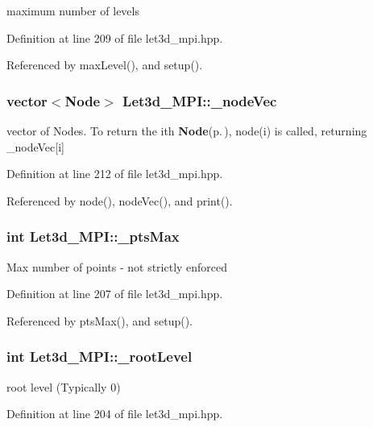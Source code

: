 maximum number of levels 

Definition at line 209 of file let3d\_\-mpi.hpp.

Referenced by max\-Level(), and setup().
\subsubsection{\setlength{\rightskip}{0pt plus 5cm}vector$<${\bf Node}$>$ {\bf Let3d\_\-MPI::\_\-node\-Vec}\hspace{0.3cm}{\tt  [protected]}}\label{classLet3d__MPI_0dca3d8b42eecae5aeb38ed9545698e8_0dca3d8b42eecae5aeb38ed9545698e8}


vector of Nodes. To return the ith {\bf Node}{\rm (p.\,\pageref{classLet3d__MPI_1_1Node})}, node(i) is called, returning \_\-node\-Vec[i] 

Definition at line 212 of file let3d\_\-mpi.hpp.

Referenced by node(), node\-Vec(), and print().
\subsubsection{\setlength{\rightskip}{0pt plus 5cm}int {\bf Let3d\_\-MPI::\_\-pts\-Max}\hspace{0.3cm}{\tt  [protected]}}\label{classLet3d__MPI_9d1de62409c283894e586edb8407d985_9d1de62409c283894e586edb8407d985}


Max number of points - not strictly enforced 

Definition at line 207 of file let3d\_\-mpi.hpp.

Referenced by pts\-Max(), and setup().
\subsubsection{\setlength{\rightskip}{0pt plus 5cm}int {\bf Let3d\_\-MPI::\_\-root\-Level}\hspace{0.3cm}{\tt  [protected]}}\label{classLet3d__MPI_01d82a06559beb8e8d5421992d7793ff_01d82a06559beb8e8d5421992d7793ff}


root level (Typically 0) 

Definition at line 204 of file let3d\_\-mpi.hpp.


